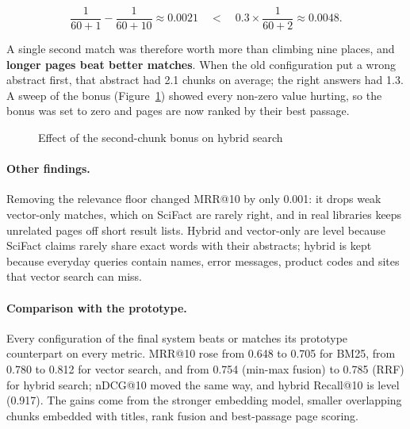 \[
\frac{1}{60+1} - \frac{1}{60+10} \approx 0.0021
\quad<\quad
0.3 \times \frac{1}{60+2} \approx 0.0048 .
\]

A single second match was therefore worth more than climbing nine places, and
\textbf{longer pages beat better matches}. When the old configuration put a
wrong abstract first, that abstract had 2.1 chunks on average; the right
answers had 1.3. A sweep of the bonus (Figure~\ref{fig:sweep}) showed every
non-zero value hurting, so the bonus was set to zero and pages are now
ranked by their best passage.

\begin{figure}[H]
\centering
{}
\caption{Effect of the second-chunk bonus on hybrid search}
\label{fig:sweep}
\end{figure}

\paragraph{Other findings.} Removing the relevance floor changed MRR@10 by
only 0.001: it drops weak vector-only matches, which on SciFact are rarely
right, and in real libraries keeps unrelated pages off short result lists.
Hybrid and vector-only are level because SciFact claims rarely share exact
words with their abstracts; hybrid is kept because everyday queries contain
names, error messages, product codes and sites that vector search can miss.

\paragraph{Comparison with the prototype.} Every configuration of the final
system beats or matches its prototype counterpart on every metric. MRR@10 rose from
0.648 to 0.705 for BM25, from 0.780 to 0.812 for vector search, and from 0.754
(min-max fusion) to 0.785 (RRF) for hybrid search; nDCG@10 moved the same
way, and hybrid Recall@10 is level (0.917). The gains come from the stronger embedding model,
smaller overlapping chunks embedded with titles, rank fusion and
best-passage page scoring.

